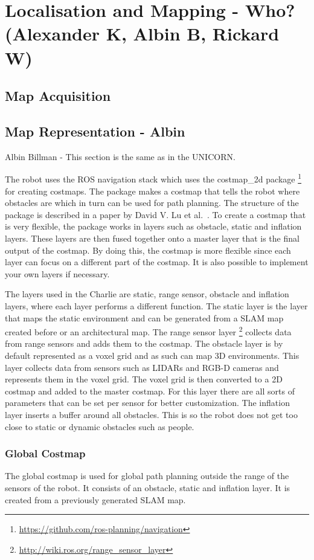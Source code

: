 \section{Localisation and Mapping - Who? (Alexander K, Albin B, Rickard W)}
\subsection{Map Acquisition}
\subsection{Map Representation - Albin}
Albin Billman - This section is the same as in the UNICORN.\\
\medskip

\noindent
The robot uses the ROS navigation stack which uses the costmap\_2d package \footnote{\url{https://github.com/ros-planning/navigation}} for creating costmaps. The package makes a costmap that tells the robot where obstacles are which in turn can be used for path planning. The structure of the package is described in a paper by David V. Lu et al.~\cite{lu2014layered}. To create a costmap that is very flexible, the package works in layers such as obstacle, static and inflation layers. These layers are then fused together onto a master layer that is the final output of the costmap. By doing this, the costmap is more flexible since each layer can focus on a different part of the costmap. It is also possible to implement your own layers if necessary.

The layers used in the Charlie are static, range sensor, obstacle and inflation layers, where each layer performs a different function. The static layer is the layer that maps the static environment and can be generated from a SLAM map created before or an architectural map. The range sensor layer \footnote{\url{http://wiki.ros.org/range_sensor_layer}} collects data from range sensors and adds them to the costmap.
The obstacle layer is by default represented as a voxel grid and as such can map 3D environments. This layer collects data from sensors such as LIDARs and RGB-D cameras and represents them in the voxel grid. The voxel grid is then converted to a 2D costmap and added to the master costmap. For this layer there are all sorts of parameters that can be set per sensor for better customization. The inflation layer inserts a buffer around all obstacles. This is so the robot does not get too close to static or dynamic obstacles such as people.


\subsubsection{Global Costmap}
The global costmap is used for global path planning outside the range of the sensors of the robot. It consists of an obstacle, static and inflation layer. It is created from a previously generated SLAM map.

